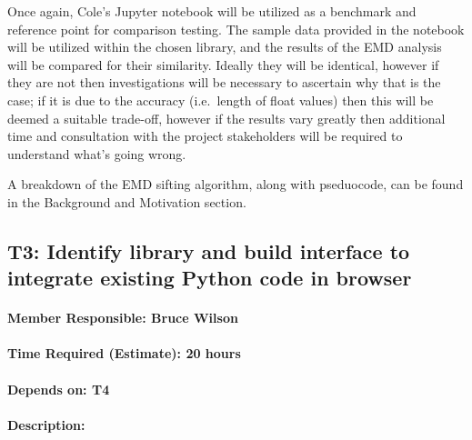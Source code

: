 \documentclass[
  paper=a4,
  ,captions=tableheading
]{scrartcl}
\begin{document}
Once again, Cole's Jupyter notebook will be utilized as a benchmark and
reference point for comparison testing. The sample data provided in the
notebook will be utilized within the chosen library, and the results of
the EMD analysis will be compared for their similarity. Ideally they
will be identical, however if they are not then investigations will be
necessary to ascertain why that is the case; if it is due to the
accuracy (i.e.~length of float values) then this will be deemed a
suitable trade-off, however if the results vary greatly then additional
time and consultation with the project stakeholders will be required to
understand what's going wrong.

A breakdown of the EMD sifting algorithm, along with pseduocode, can be
found in the Background and Motivation section.

\newpage
\hypertarget{t3-identify-library-and-build-interface-to-integrate-existing-python-code-in-browser}{%
\subsection{T3: Identify library and build interface to integrate
existing Python code in
browser}\label{t3-identify-library-and-build-interface-to-integrate-existing-python-code-in-browser}}

\hypertarget{member-responsible-bruce-wilson}{%
\paragraph{Member Responsible: Bruce
Wilson}\label{member-responsible-bruce-wilson}}

\hypertarget{time-required-estimate-20-hours}{%
\paragraph{Time Required (Estimate): 20
hours}\label{time-required-estimate-20-hours}}

\hypertarget{depends-on-t4}{%
\paragraph{Depends on: T4}\label{depends-on-t4}}

\hypertarget{description-1}{%
\paragraph{Description:}\label{description-1}}
\end{document}
